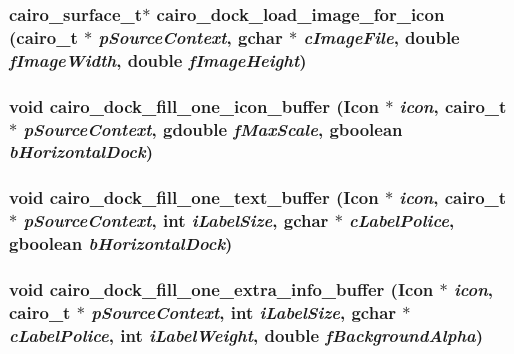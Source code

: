 \subsubsection{\setlength{\rightskip}{0pt plus 5cm}cairo\_\-surface\_\-t$\ast$ cairo\_\-dock\_\-load\_\-image\_\-for\_\-icon (cairo\_\-t $\ast$ {\em p\-Source\-Context}, gchar $\ast$ {\em c\-Image\-File}, double {\em f\-Image\-Width}, double {\em f\-Image\-Height})}\label{cairo-dock-load_8c_2773d15f186da24a5ce837a12f9c9339}


\subsubsection{\setlength{\rightskip}{0pt plus 5cm}void cairo\_\-dock\_\-fill\_\-one\_\-icon\_\-buffer ({\bf Icon} $\ast$ {\em icon}, cairo\_\-t $\ast$ {\em p\-Source\-Context}, gdouble {\em f\-Max\-Scale}, gboolean {\em b\-Horizontal\-Dock})}\label{cairo-dock-load_8c_4a3a06aed66d049d7d081928a25d1aee}


\subsubsection{\setlength{\rightskip}{0pt plus 5cm}void cairo\_\-dock\_\-fill\_\-one\_\-text\_\-buffer ({\bf Icon} $\ast$ {\em icon}, cairo\_\-t $\ast$ {\em p\-Source\-Context}, int {\em i\-Label\-Size}, gchar $\ast$ {\em c\-Label\-Police}, gboolean {\em b\-Horizontal\-Dock})}\label{cairo-dock-load_8c_c1c4f6235fed0fe3c1e929d9e3b28a1d}


\subsubsection{\setlength{\rightskip}{0pt plus 5cm}void cairo\_\-dock\_\-fill\_\-one\_\-extra\_\-info\_\-buffer ({\bf Icon} $\ast$ {\em icon}, cairo\_\-t $\ast$ {\em p\-Source\-Context}, int {\em i\-Label\-Size}, gchar $\ast$ {\em c\-Label\-Police}, int {\em i\-Label\-Weight}, double {\em f\-Background\-Alpha})}\label{cairo-dock-load_8c_ec691e14b4c9bfde0be8f3f7fb200beb}



